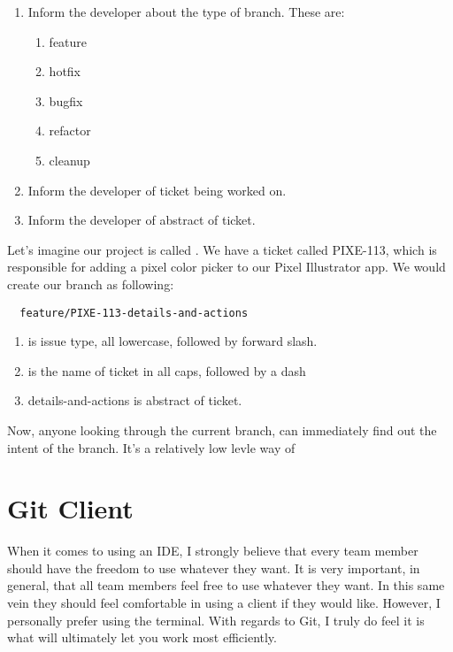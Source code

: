 \begin{enumerate}
  \item Inform the developer about the type of branch. These are:
    \begin{enumerate}
      \item feature
      \item hotfix
      \item bugfix
      \item refactor
      \item cleanup
    \end{enumerate}
  \item Inform the developer of ticket being worked on.
  \item Inform the developer of abstract of ticket.
\end{enumerate}

Let's imagine our project is called . We have a ticket called PIXE-113, which is responsible for adding a pixel color picker to our Pixel Illustrator app. We would create our branch as following:

\begin{verbatim}
  feature/PIXE-113-details-and-actions
\end{verbatim}

\begin{enumerate}
  \item {} is issue type, all lowercase, followed by forward slash.
  \item {} is the name of ticket in all caps, followed by a dash
  \item details-and-actions is abstract of ticket.
\end{enumerate} 

Now, anyone looking through the current branch, can immediately find out the intent of the branch. It's a relatively low levle way of 

\section { Git Client }
When it comes to using an IDE, I strongly believe that every team member should
have the freedom to use whatever they want. It is very important, in general,
that all team members feel free to use whatever they want. In this same vein
they should feel comfortable in using a client if they would like. However, I personally prefer using the terminal. With regards to Git, I truly do feel it is what will ultimately let you work most efficiently.

